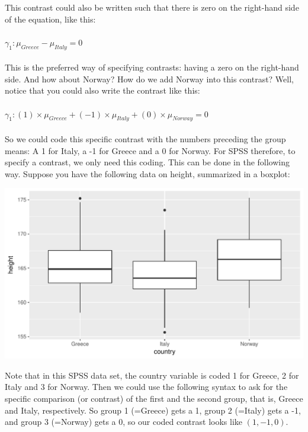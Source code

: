 \documentclass[]{report}\usepackage[]{graphicx}\usepackage[]{color}
\makeatletter
\def\maxwidth{ %
  \ifdim\Gin@nat@width>\linewidth
    \linewidth
  \else
    \Gin@nat@width
  \fi
}
\newenvironment{knitrout}{}{} %
\makeatother
\begin{document}
This contrast could also be written such that there is zero on the right-hand side of the equation, like this:
\\
\\
$\gamma_1: \mu_{Greece}-\mu_{Italy}=0$
\\
\\
This is the preferred way of specifying contrasts: having a zero on the right-hand side. And how about Norway? How do we add Norway into this contrast? Well, notice that you could also write the contrast like this:
\\
\\
$\gamma_1: (1)\times \mu_{Greece} + (-1) \times \mu_{Italy} + (0) \times \mu_{Norway} =0$
\\
\\
So we could code this specific contrast with the numbers preceding the group means: A 1 for Italy, a -1 for Greece and a 0 for Norway. For SPSS therefore, to specify a contrast, we only need this coding. This can be done in the following way. Suppose you have the following data on height, summarized in a boxplot:


\begin{knitrout}
\color{fgcolor}

{\centering \includegraphics[width=\maxwidth]{figure/fig1416-1} 

}



\end{knitrout}

Note that in this SPSS data set, the country variable is coded 1 for Greece, 2 for Italy and 3 for Norway. Then we could use the following syntax to ask for the specific comparison (or contrast) of the first and the second group, that is, Greece and Italy, respectively. So group 1 (=Greece) gets a 1, group 2 (=Italy) gets a -1, and group 3 (=Norway) gets a 0, so our coded contrast looks like $(1, -1, 0)$.
\end{document}
